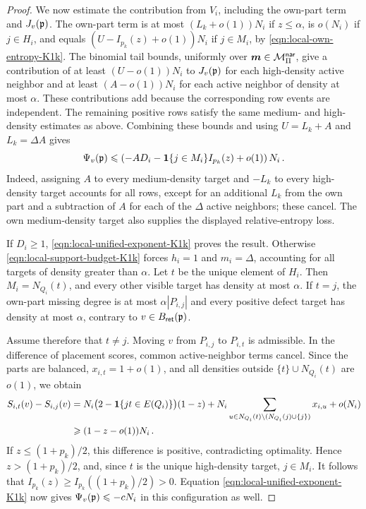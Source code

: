 \begin{proof}
We now estimate the contribution from $V_i$, including the own-part term and $J_v({\mathfrak p})$. The own-part term is at most $(L_k+o(1))N_i$ if $z\leq\alpha$, is $o(N_i)$ if $j\in H_i$, and equals $(U-I_{p_k}(z)+o(1))N_i$ if $j\in M_i$, by \eqref{eqn:local-own-entropy-K1k}. The binomial tail bounds, uniformly over $\boldsymbol{m}\in{\mathcal M}^{\mathsf{nar}}_\Pi$, give a contribution of at least $(U-o(1))N_i$ to $J_v({\mathfrak p})$ for each high-density active neighbor and at least $(A-o(1))N_i$ for each active neighbor of density at most $\alpha$. These contributions add because the corresponding row events are independent. The remaining positive rows satisfy the same medium- and high-density estimates as above. Combining these bounds and using $U=L_k+A$ and $L_k=\Delta A$ gives
\begin{equation}\label{eqn:local-unified-exponent-K1k}
\Psi_v({\mathfrak p})\leqslant\left(-AD_i-\boldsymbol{1}\{j\in M_i\}I_{p_k}(z)+o(1)\right)N_i\,.
\end{equation}
Indeed, assigning $A$ to every medium-density target and $-L_k$ to every high-density target accounts for all rows, except for an additional $L_k$ from the own part and a subtraction of $A$ for each of the $\Delta$ active neighbors; these cancel. The own medium-density target also supplies the displayed relative-entropy loss.

If $D_i\geq1$, \eqref{eqn:local-unified-exponent-K1k} proves the result. Otherwise \eqref{eqn:local-support-budget-K1k} forces $h_i=1$ and $m_i=\Delta$, accounting for all targets of density greater than $\alpha$. Let $t$ be the unique element of $H_i$. Then $M_i=N_{Q_i}(t)$, and every other visible target has density at most $\alpha$. If $t=j$, the own-part missing degree is at most $\alpha|P_{i,j}|$ and every positive defect target has density at most $\alpha$, contrary to $v\in B_{\mathsf{ret}}({\mathfrak p})$.

Assume therefore that $t\neq j$. Moving $v$ from $P_{i,j}$ to $P_{i,t}$ is admissible. In the difference of placement scores, common active-neighbor terms cancel. Since the parts are balanced, $x_{i,t}=1+o(1)$, and all densities outside $\{t\}\cup N_{Q_i}(t)$ are $o(1)$, we obtain
\begin{align*}
S_{i,t}(v)-S_{i,j}(v)&=N_i\bigl(2-\boldsymbol{1}\{jt\in E(Q_i)\}\bigr)(1-z)+N_i\sum_{u\in N_{Q_i}(t)\setminus(N_{Q_i}(j)\cup\{j\})}x_{i,u}+o(N_i)\\
&\geqslant(1-z-o(1))N_i\,.
\end{align*}
If $z\leq(1+p_k)/2$, this difference is positive, contradicting optimality. Hence $z>(1+p_k)/2$, and, since $t$ is the unique high-density target, $j\in M_i$. It follows that $I_{p_k}(z)\geq I_{p_k}((1+p_k)/2)>0$. Equation \eqref{eqn:local-unified-exponent-K1k} now gives $\Psi_v({\mathfrak p})\leqslant-cN_i$ in this configuration as well.


\end{proof}
